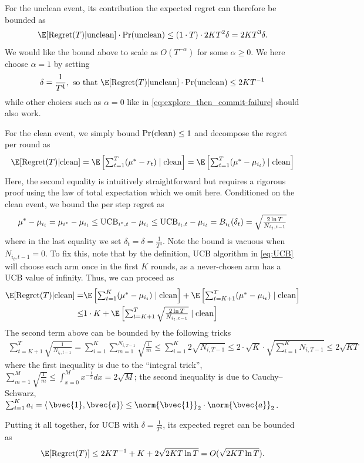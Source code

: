 For the unclean event, its contribution the expected regret can therefore be bounded as
\begin{align*}
    \E[\Regret(T) | {\rm unclean}] \cdot \Pr({\rm unclean})
    \leq (1\cdot T) \cdot 2KT^2\delta =  2KT^3\delta
    .
\end{align*}
We would like the bound above to scale as $O(T^{-\alpha})$ for some $\alpha\geq0$.
We here choose $\alpha=1$ by setting 
\begin{align}
\label{eq:UCB-unclean}
    \delta=\frac{1}{T^4},
    \text{ so that }
    \E[\Regret(T) | {\rm unclean}] \cdot \Pr({\rm unclean}) \leq 2KT^{-1}
\end{align}
while other choices such as $\alpha=0$ like in  \eqref{eq:explore_then_commit-failure} should also work. 

For the clean event, we simply bound $\Pr({\rm clean})\leq1$ and decompose the regret per round as 
\begin{align*}
\E[\Regret(T) | {\rm clean}] = \E\left[\textstyle\sum_{t=1}^{T} (\mu^*-r_t) \mid {\rm clean}\right] = 
\E\left[\textstyle\sum_{t=1}^{T} (\mu^*-\mu_{i_t}) \mid {\rm clean}\right]
\end{align*}
Here, the second equality is intuitively straightforward but requires a rigorous proof using the law of total expectation which we omit here.
Conditioned on the clean event, we bound the per step regret as 
\begin{align*}
   \mu^*-\mu_{i_t} = \mu_{i^*}-\mu_{i_t} \leq  {\rm UCB}_{i^*,t} - \mu_{i_t}
   \leq {\rm UCB}_{i_t,t} - \mu_{i_t}
   = B_{i_t}(\delta_t)
   = \sqrt{\tfrac{2\ln T}{N_{i_t,t-1}}}
\end{align*}
where in the last equality we set $\delta_t=\delta=\frac{1}{T^4}$.
Note the bound is vacuous when $N_{i_t,t-1}=0$. To fix this, note that by the definition, UCB algorithm in \eqref{eq:UCB} will choose each arm once in the first $K$ rounds, as a never-chosen arm has a UCB value of infinity.
Thus, we can proceed as
\begin{align*}
\E[\Regret(T) | {\rm clean}] = &
\E\left[\textstyle\sum_{t=1}^{K} (\mu^*-\mu_{i_t}) \mid {\rm clean}\right] + \E\left[\textstyle\sum_{t=K+1}^{T} (\mu^*-\mu_{i_t}) \mid {\rm clean}\right] \\
\leq& 1\cdot K + \E\left[\textstyle\sum_{t=K+1}^{T} \sqrt{\tfrac{2\ln T}{N_{i_t,t-1}}} \mid {\rm clean}\right]
\end{align*}
The second term above can be bounded by the following tricks
\begin{align*}
\sum_{t=K+1}^{T} \sqrt{\frac{1}{N_{i_t,t-1}}} = \sum_{i=1}^{K}\sum_{m=1}^{N_{i,T-1}}\sqrt{\frac{1}{m}} 
\leq \sum_{i=1}^{K}  2\sqrt{N_{i,T-1}}\leq 2 \cdot \sqrt{K} \cdot \sqrt{\textstyle\sum_{i=1}^K N_{i,T-1}}
\leq 2\sqrt{KT}
\end{align*}
where 
the first inequality is due to the ``integral trick'', $\sum_{m=1}^{M}\sqrt{\frac{1}{m}}\leq\int_{x=0}^M x^{-\frac{1}{2}}dx=2\sqrt{M}$;
the second inequality is due to Cauchy–Schwarz, $\sum_{i=1}^{K}a_i = \langle\,\bvec{1},\bvec{a}\rangle\leq\norm{\bvec{1}}_2\cdot\norm{\bvec{a}}_2$.

Putting it all together, for UCB with $\delta=\frac{1}{T^4}$, its expected regret can be bounded as
\begin{align*}
    \E[\Regret(T)] \leq 2KT^{-1} + K + 2\sqrt{2KT\ln T} = O(\sqrt{2KT\ln T})
    .
\end{align*}
